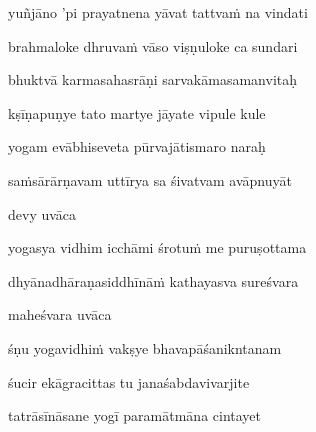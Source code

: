 yuñjāno 'pi prayatnena yāvat tattva\.m na vindati\thinspace{\dandab} \dontdisplaylinenum

brahmaloke dhruva\.m vāso viṣṇuloke ca sundari \veg\dontdisplaylinenum

bhuktvā karmasahasrāṇi sarvakāmasamanvitaḥ\thinspace{\dandab} \dontdisplaylinenum

kṣīṇapuṇye tato martye jāyate vipule kule \veg\dontdisplaylinenum

yogam evābhiseveta pūrvajātismaro naraḥ\thinspace{\dandab} \dontdisplaylinenum

sa\.msārārṇavam uttīrya sa śivatvam avāpnuyāt \veg\dontdisplaylinenum


devy uvāca~{\dandab}\dontdisplaylinenum 

yogasya vidhim icchāmi śrotu\.m me puruṣottama\thinspace{\danda} \dontdisplaylinenum

dhyānadhāraṇasiddhīnā\.m kathayasva sureśvara \veg\dontdisplaylinenum

maheśvara uvāca~{\dandab}\dontdisplaylinenum 

śṇu yogavidhi\.m vakṣye bhavapāśanikntanam\thinspace{\danda} \dontdisplaylinenum

śucir ekāgracittas tu janaśabdavivarjite \danda\dontdisplaylinenum

tatrāsīnāsane yogī paramātmāna cintayet \veg\dontdisplaylinenum

